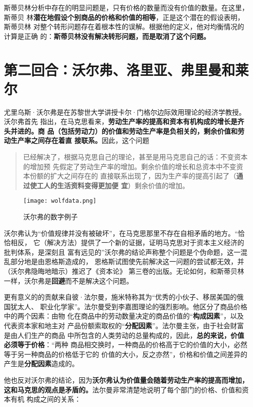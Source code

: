 斯蒂贝林分析中存在的明显问题是，只有价格的数量而没有价值的数量。在这里，斯蒂贝
林\textbf{潜在地假设个别商品的价格和价值的相等}，正是这个潜在的假设表明，斯蒂贝林
对整个转形问题存在着根本性的误解。根据他的定义，他对均衡情况的计算是正确
的：\textbf{斯蒂贝林没有解决转形问题，而是取消了这个问题。}

\section{第二回合：沃尔弗、洛里亚、弗里曼和莱尔}
尤里乌斯·沃尔弗是在苏黎世大学讲授卡尔·门格尔边际效用理论的经济学教授。沃尔弗首先
指出，在马克思看来，\textbf{劳动生产率的提高和资本有机构成的增长是齐头并进的。商
  品（包括劳动力）的价值和劳动生产率是负相关的，剩余价值和劳动生产率之间存在着直
  接联系。}因此，这个问题
\begin{quotation}
  已经解决了，根据马克思自己的理论，甚至是用马克思自己的话：不变资本的增加预
  先假定了劳动生产率的增加。剩余价值的增长和总资本中不变资本份额的扩大之间存在的
  直接联系出现了，因为生产率的提高引起了（\textbf{通过使工人的生活资料变得更加便
    宜}）剩余价值的增加。
\end{quotation}

\begin{figure}
\centering
\texttt{[image: wolfdata.png]}
\caption{沃尔弗的数字例子}
\label{fig:wolfdata}
\end{figure}

沃尔弗认为“价值规律并没有被破坏”，在马克思那里不存在自相矛盾的地方。“恰恰相反，
它（解决方法）提供了一个新的证据，证明马克思对于资本主义经济的批判体系，是深刻且
富有远见的”沃尔弗的结论声称整个问题是个伪命题，这一混乱部分地是由恩格斯造成的，
恩格斯试图使先前解决这一问题的尝试都无效，并（沃尔弗隐晦地暗示）推迟了《资本论》
第三卷的出版。无论如何，和斯蒂贝林一样，沃尔弗是\textbf{回避}而不是解决这个问题。

更有意义的的贡献来自彼·法尔曼，施米特称其为“优秀的小伙子、移居美国的俄国犹太人、
职业化学家”。法尔曼受到李嘉图理论的强烈影响。他区分了商品价格中的两个因素：由物
化在商品中的劳动数量决定的商品价值的“\textbf{构成因素}”，以及代表资本家和地主对
产品份额索取权的“\textbf{分配因素}”。法尔曼主张，由于社会财富是由人们生产的商品
中所包含的人类劳动的总量构成的，因此，\textbf{总的来说，价值必须等于价格}：“两种
商品相交换时，一种商品的价格高于它的价值的大小，必然等于另一种商品的价格低于它的
价值的大小，反之亦然”，价格和价值之间差异的产生是\textbf{分配因素}造成的。

他也反对沃尔弗的结论，因为\textbf{沃尔弗认为价值量会随着劳动生产率的提高而增加，
  这和马克思的观点是矛盾的。}法尔曼非常清楚地说明了每个部门的价格、价值和资本有机
构成之间的关系：

